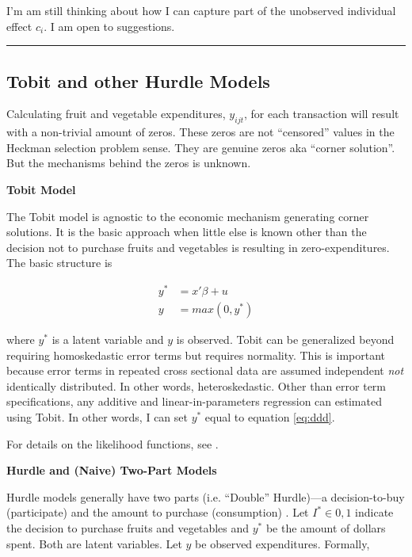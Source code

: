 \documentclass[12pt,letterpaperpaper,]{book}
\begin{document}
I'm am still thinking about how I can capture part of the unobserved
individual effect \(c_i\). I am open to suggestions.

\begin{center}\rule{0.5\linewidth}{\linethickness}\end{center}

\subsection*{Tobit and other Hurdle
Models}\label{tobit-and-other-hurdle-models}

Calculating fruit and vegetable expenditures, \(y_{ijt}\), for each
transaction will result with a non-trivial amount of zeros. These zeros
are not ``censored'' values in the Heckman selection problem sense. They
are genuine zeros aka ``corner solution''. But the mechanisms behind the
zeros is unknown.

\textbf{Tobit Model}

The Tobit model is agnostic to the economic mechanism generating corner
solutions. It is the basic approach when little else is known other than
the decision not to purchase fruits and vegetables is resulting in
zero-expenditures. The basic structure is

\[
\begin{aligned}
y^* &= x'\beta + u \\
y &= max(0, y^*)
\end{aligned}
\]

where \(y^*\) is a latent variable and \(y\) is observed. Tobit can be
generalized beyond requiring homoskedastic error terms but requires
normality. This is important because error terms in repeated cross
sectional data are assumed independent \emph{not} identically
distributed. In other words, heteroskedastic. Other than error term
specifications, any additive and linear-in-parameters regression can
estimated using Tobit. In other words, I can set \(y^*\) equal to
equation \eqref{eq:ddd}.

For details on the likelihood functions, see \citet{amemiya_tobit_1984}.

\textbf{Hurdle and (Naive) Two-Part Models}

Hurdle models generally have two parts (i.e. ``Double'' Hurdle)---a
decision-to-buy (participate) and the amount to purchase (consumption)
\citep{jones_double-hurdle_1989}. Let \(I^* \in {0,1}\) indicate the
decision to purchase fruits and vegetables and \(y^*\) be the amount of
dollars spent. Both are latent variables. Let \(y\) be observed
expenditures. Formally,
\end{document}
